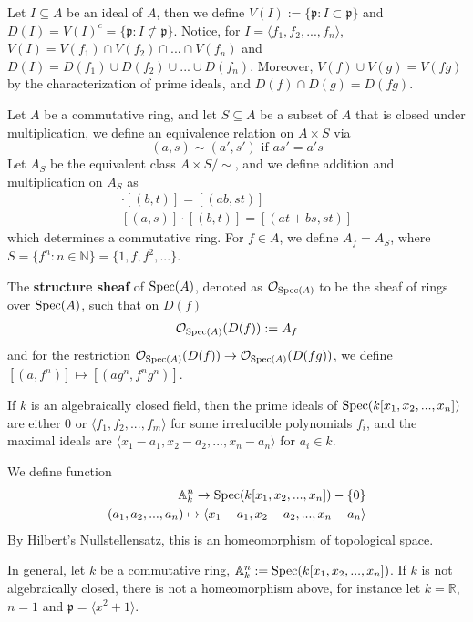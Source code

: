 Let $I\subseteq A$ be an ideal of $A$, then we define $V(I):=\{\mathfrak{p}: I\subset \mathfrak{p}\}$ and $D(I)=V(I)^c=\{\mathfrak{p}: I\not\subset \mathfrak{p}\}$.
 Notice, for $I=\langle f_1,f_2,...,f_n\rangle$, $V(I)= V(f_1)\cap V(f_2)\cap...\cap V(f_n)$ and $D(I)=D(f_1)\cup D(f_2)\cup...\cup D(f_n)$. Moreover, $V(f)\cup V(g)=V(fg)$ by the characterization of prime ideals, and $D(f)\cap D(g)=D(fg)$.


\begin{definition}
    Let $A$ be a commutative ring, and let $S\subseteq A$ be a subset of $A$ that is closed under multiplication, we define an equivalence relation on $A\times S$ via 
    \[
    (a,s)\sim (a',s')\text{ if } as'=a's
    \]
    Let $A_S$ be the equivalent class $A\times S/\sim$, and we define addition and multiplication on $A_S$ as
    \begin{align*}
        [(a,s)]\cdot[(b,t)]=[(ab, st)]
        \\ [(a,s)]\cdot[(b,t)]=[(at+bs, st)]
    \end{align*}which determines a commutative ring. For $f\in A$, we define $A_f=A_S$, where $S=\{f^n: n\in \mathbb{N}\}=\{1,f,f^2,...\} $.
\end{definition}

\begin{definition}
    The \textbf{structure sheaf} of $\operatorname{\mathrm{Spec}}(A)$, denoted as $\mathcal{O}_{\operatorname{\mathrm{Spec}}(A)}$ to be the sheaf of rings over $\operatorname{\mathrm{Spec}}(A)$, such that on $D(f)$
    \begin{align*}
    \mathcal{O}_{\operatorname{\mathrm{Spec}}(A)}(D(f)):=A_{f}
    \end{align*}and for the restriction $\mathcal{O}_{\operatorname{\mathrm{Spec}}(A)}(D(f))\to    \mathcal{O}_{\operatorname{\mathrm{Spec}}(A)}(D(fg))$, we define $[(a,f^n)]\mapsto [(ag^n, f^ng^n)]$.
\end{definition}

\begin{example} 
    
    If $k$ is an algebraically closed field, then the prime ideals of $\operatorname{\mathrm{Spec}}(k[x_1,x_2,...,x_n])$ are either $0$ or $\langle f_1,f_2,...,f_m\rangle$ for some irreducible polynomials $f_i$, and the maximal ideals are $\langle x_1-a_1,x_2-a_2,...,x_n-a_n\rangle$ for $a_i \in k$.
    
    We define function
    \begin{align*}
        \mathbb{A}^n_k\to \operatorname{\mathrm{Spec}}(k[x_1,x_2,...,x_n])-\{0\}
        \\ (a_1,a_2,...,a_n)\mapsto \langle x_1-a_1,x_2-a_2,...,x_n-a_n\rangle
    \end{align*}
    By Hilbert's Nullstellensatz, this is an homeomorphism of topological space.

    In general, let $k$ be a commutative ring, $\mathbb{A}_k^n:=\operatorname{\mathrm{Spec}}(k[x_1,x_2,...,x_n])$. If $k$ is not algebraically closed, there is not a homeomorphism above, for instance let $k=\mathbb{R}$, $n=1$ and $\mathfrak{p}=\langle x^2+1\rangle$.
\end{example}

